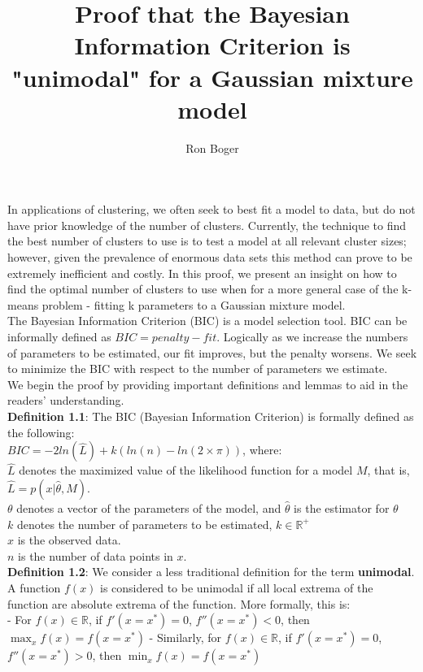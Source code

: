 \documentclass{article}
\title{Proof that the Bayesian Information Criterion is "unimodal" for a Gaussian mixture model}
\author{Ron Boger}
\date{}
\begin{document}
\maketitle

In applications of clustering, we often seek to best fit a model to data, but do not have prior knowledge of the number of clusters. Currently, the technique to find the best number of clusters to use is to test a model at all relevant cluster sizes; however, given the prevalence of enormous data sets this method can prove to be extremely inefficient and costly. In this proof, we present an insight on how to find the optimal number of clusters to use when for a more general case of the k-means problem - fitting k parameters to a Gaussian mixture model.\\

The Bayesian Information Criterion (BIC) is a model selection tool. BIC can be informally defined as \(BIC = penalty - fit\). Logically as we increase the numbers of parameters to be estimated, our fit improves, but the penalty worsens. We seek to minimize the BIC with respect to the number of parameters we estimate.\\

We begin the proof by providing important definitions and lemmas to aid in the readers' understanding.\\

\textbf{Definition 1.1}: The BIC (Bayesian Information Criterion) is formally defined as the following:\\
\(BIC = -2ln(\hat{L}) + k(ln(n) - ln(2 \times \pi))\), where:\\
\(\hat{L}\) denotes the maximized value of the likelihood function for a model \(M\), that is, \(\hat{L} = p(x|\hat{\theta}, M)\).\\
\(\theta\) denotes a vector of the parameters of the model, and \(\hat{\theta}\) is the estimator for \(\theta\)\\
\(k\) denotes the number of parameters to be estimated, \(k \in \mathbb{R}^{+}\)\\
\(x\) is the observed data.\\
\(n\) is the number of data points in \(x\).\\

\textbf{Definition 1.2}: We consider a less traditional definition for the term \textbf{unimodal}. A function \(f(x)\) is considered to be unimodal if all local extrema of the function are absolute extrema of the function. More formally, this is:\\
- For \(f(x) \in \mathbb{R}\), if \(f'(x = x^{*}) = 0\), \(f''(x= x^{*}) <0\), then \(\max_{x} f(x) = f(x = x^{*})\)
- Similarly, for \(f(x) \in \mathbb{R}\), if \(f'(x = x^{*}) = 0\), \(f''(x= x^{*}) > 0\), then \(\min_{x} f(x) = f(x = x^{*})\)
\end{document}
